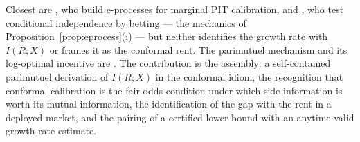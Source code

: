 \documentclass[11pt]{article}
\begin{document}
Closest are \citet{arnold2023}, who build e-processes for marginal PIT calibration, and
\citet{shaer2023}, who test conditional independence by betting --- the mechanics of
Proposition~\ref{prop:eprocess}(i) --- but neither identifies the growth rate with $I(R;X)$ or frames
it as the conformal rent. The parimutuel mechanism and its log-optimal incentive are
\citet{cotton_micro2022,cotton_horserace,micro_density}. The contribution is the assembly: a
self-contained parimutuel derivation of $I(R;X)$ in the conformal idiom, the recognition that
conformal calibration is the fair-odds condition under which side information is worth its mutual
information, the identification of the gap with the rent in a deployed market, and the pairing of a
certified lower bound with an anytime-valid growth-rate estimate.



\end{document}
